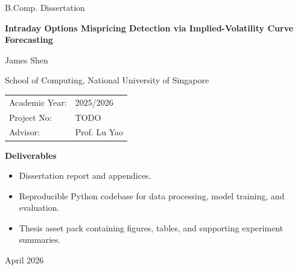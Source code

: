 \documentclass[12pt]{report}
\begin{document}
\hypersetup{pageanchor=false}

\begin{titlepage}
\thispagestyle{empty}
\centering

{\Large B.Comp. Dissertation\par}
\vspace{1.0cm}

{\Huge\bfseries Intraday Options Mispricing Detection via Implied-Volatility Curve Forecasting
}
\vspace{1.4cm}

{\Large James Shen\par}
\vspace{0.5cm}
{\large School of Computing, National University of Singapore\par}
\vspace{1.0cm}

\begin{tabular}{@{}ll@{}}
Academic Year: & 2025/2026 \\
Project No: & TODO \\
Advisor: & Prof. Lu Yao \\
\end{tabular}

\vfill

\begin{minipage}{0.82\textwidth}
\textbf{Deliverables}
\begin{itemize}[leftmargin=1.2cm,itemsep=0.15em]
    \item Dissertation report and appendices.
    \item Reproducible Python codebase for data processing, model training, and evaluation.
    \item Thesis asset pack containing figures, tables, and supporting experiment summaries.
\end{itemize}
\end{minipage}

\vfill
{\large April 2026\par}
\end{titlepage}

\cleardoublepage
\setcounter{page}{1}
\end{document}
